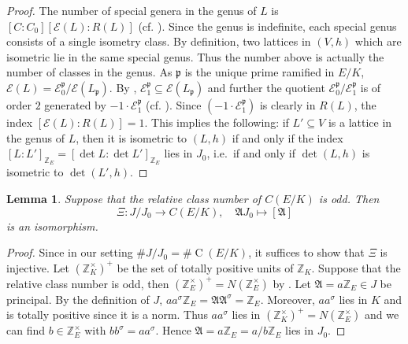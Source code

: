 \documentclass{amsart}
\theoremstyle{definition}
\theoremstyle{plain}
\newtheorem{lemma}[definition]{Lemma}
\DeclareMathOperator{\Cl}{C}
\newcommand{\ZZ}{\mathbb{Z}}
\begin{document}
\begin{proof}
The number of special genera in the genus of $L$ is
$[C:C_0] [\mathcal{E}(L):R(L)]$ (cf. \cite[Lem.\ 4.6]{kirschmer:determinants}). Since the genus is indefinite, each special genus consists of a single isometry class. By definition, two lattices in $(V,h)$ which are isometric lie in the same special genus. Thus the number above is actually the number of classes in the genus.
As $\mathfrak{p}$ is the unique prime ramified in $E/K$,
$\mathcal{E}(L)=\mathcal{E}_0^\mathfrak{p}
/\mathcal{E}(L_\mathfrak{p})$.
By \cite[Thm.\ 3.7]{kirschmer:determinants},
$\mathcal{E}_1^\mathfrak{p} \subseteq\mathcal{E}(L_\mathfrak{p})$
and further the quotient $\mathcal{E}_0^\mathfrak{p}/
\mathcal{E}_1^\mathfrak{p}$ is of order $2$
generated by $-1 \cdot \mathcal{E}_1^\mathfrak{p}$
(cf. \cite[Lem.\ 3.5]{kirschmer:determinants}).
Since $(-1\cdot\mathcal{E}_1^\mathfrak{p})$ is clearly in $R(L)$, the index
$[\mathcal{E}(L):R(L)]=1$.
This implies the following: if $L' \subseteq V$ is a lattice in the genus of $L$, then it is isometric to $(L,h)$ if and only if the index $[L : L']_{\ZZ_E}=[\det L : \det L']_{\ZZ_E}$
lies in $J_0$, i.e.\ if and only if $\det (L,h)$ is isometric to $\det (L',h)$.
\end{proof}
\begin{lemma}
Suppose that the relative class number of $C(E/K)$ is odd. Then
\[\Xi\colon J/J_0 \rightarrow C(E/K),\quad \mathfrak{A}J_0 \mapsto [\mathfrak{A}]\]
is an isomorphism.
\end{lemma}
\begin{proof}
 Since in our setting $\# J/J_0 = \#\Cl(E/K)$, it suffices to show that $\Xi$ is injective.
 Let $(\ZZ_K^\times)^+$ be the set of totally positive units of $\ZZ_K$.
 Suppose that the relative class number is odd, then $(\ZZ_E^\times)^+= N(\ZZ_E^\times)$ by \cite[Prop.\ A.2]{shimura:abelian}. Let $\mathfrak{A}=a\ZZ_E \in J$ be principal. By the definition of $J$, $aa^\sigma \ZZ_E = \mathfrak{A}\mathfrak{A}^\sigma =  \ZZ_E$. Moreover, $aa^\sigma$ lies in $K$ and is totally positive since it is a norm. Thus $aa^\sigma$ lies in $ (\ZZ_K^\times)^+ = N(\ZZ_E^\times)$ and we can find  $b \in \ZZ_E^\times$ with $bb^\sigma = aa^\sigma$.
 Hence $\mathfrak{A} = a \ZZ_E = a/b \ZZ_E$ lies in $J_0$.
\end{proof}
\end{document}
